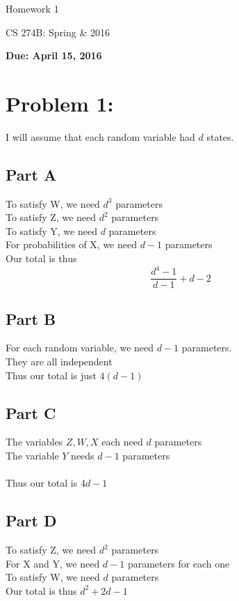 \documentclass[twoside,11pt]{article}
\theoremstyle{definition}
\begin{document}
\centerline{\Large Homework 1}
\centerline{CS 274B: Spring \& 2016}
\centerline{\bf Due: April 15, 2016}

\section*{Problem 1: }

I will assume that each random variable had $d$ states.

\subsection*{Part A}

To satisfy W, we need $d^3$ parameters \\
To satisfy Z, we need $d^2$ parameters \\
To satisfy Y, we need $d$ parameters\\
For probabilities of X, we need $d-1$ parameters\\
Our total is thus
\[
\frac{d^4-1}{d-1} + d - 2
\]

\subsection*{Part B}

For each random variable, we need $d-1$ parameters. \\
They are all independent\\
Thus our total is just $4(d-1)$

\subsection*{Part C}

The variables $Z,W,X$ each need $d$ parameters\\
The variable $Y$ needs $d-1$ parameters\\
\\
Thus our total is $4d-1$

\subsection*{Part D}

To satisfy Z, we need $d^2$ parameters\\
For X and Y, we need $d-1$ parameters for each one\\
To satisfy W, we need $d$ parameters\\
Our total is thus $d^2 + 2d - 1$
\end{document}
